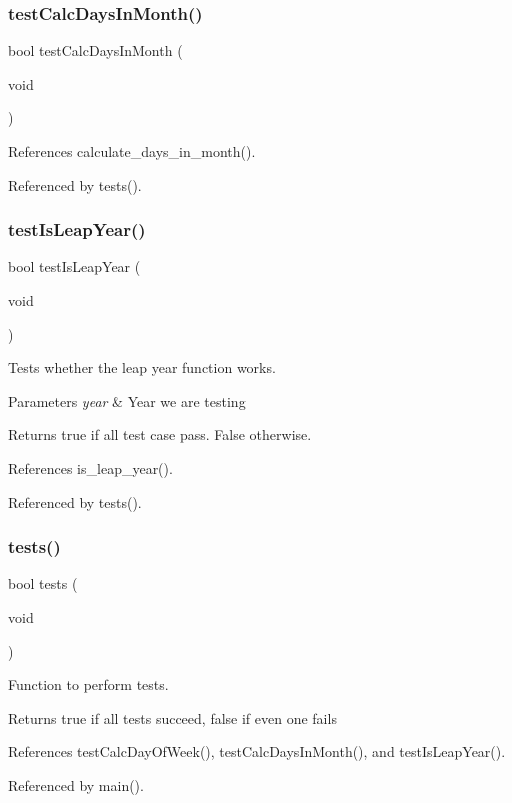 \subsubsection{test\+Calc\+Days\+In\+Month()}
{\footnotesize\ttfamily bool test\+Calc\+Days\+In\+Month (\begin{DoxyParamCaption}\item[{void}]{ }\end{DoxyParamCaption})}



References calculate\+\_\+days\+\_\+in\+\_\+month().



Referenced by tests().

\mbox{\label{tests_8c_a4b7126dd5f2bce3c1215754b4431dedc}} 
\subsubsection{test\+Is\+Leap\+Year()}
{\footnotesize\ttfamily bool test\+Is\+Leap\+Year (\begin{DoxyParamCaption}\item[{void}]{ }\end{DoxyParamCaption})}

Tests whether the leap year function works. 
\begin{DoxyParams}{Parameters}
{\em year} & Year we are testing \\
\hline
\end{DoxyParams}
\begin{DoxyReturn}{Returns}
true if all test case pass. False otherwise. 
\end{DoxyReturn}


References is\+\_\+leap\+\_\+year().



Referenced by tests().

\mbox{\label{tests_8c_a5e6e6e78df62797046c9ea173550a68a}} 
\subsubsection{tests()}
{\footnotesize\ttfamily bool tests (\begin{DoxyParamCaption}\item[{void}]{ }\end{DoxyParamCaption})}

Function to perform tests. \begin{DoxyReturn}{Returns}
true if all tests succeed, false if even one fails 
\end{DoxyReturn}


References test\+Calc\+Day\+Of\+Week(), test\+Calc\+Days\+In\+Month(), and test\+Is\+Leap\+Year().



Referenced by main().


